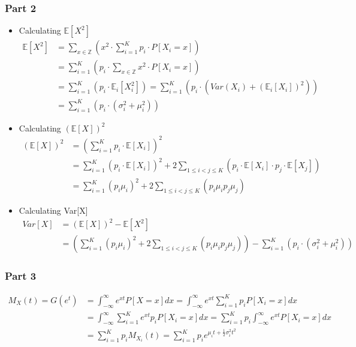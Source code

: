 \subsubsection{Part 2}
\begin{itemize}
\item Calculating $\mathbb{E}[X^2]$
\begin{align*}
    \mathbb{E}[X^2]&=\sum_{x\in \mathbb{Z}} \left(x^2 \cdot \sum_{i=1}^{K} p_i\cdot P[X_i=x] \right) \\
    &=\sum_{i=1}^{K} \left(p_i\cdot \sum_{x\in \mathbb{Z}} x^2 \cdot P[X_i=x]\right)\\
    &=\sum_{i=1}^{K} \left(p_i\cdot \mathbb{E}_i[X_i^2]\right)
    =\sum_{i=1}^{K} \left(p_i\cdot \left(Var(X_i) + \left(\mathbb{E}_i[X_i]\right)^2\right)\right)\\
    &=\sum_{i=1}^{K} \left(p_i\cdot \left(\sigma_i^2 + \mu_i^2\right)\right)
\end{align*}
\item Calculating $\left(\mathbb{E}[X]\right)^2$
\begin{align*}
    \left(\mathbb{E}[X]\right)^2&=\left(\sum_{i=1}^{K} p_i\cdot \mathbb{E}[X_i]\right)^2\\
    &=\sum_{i=1}^{K} \left(p_i\cdot \mathbb{E}[X_i]\right)^2 + 2 \sum_{1\leq i<j\leq K} \left(p_i\cdot \mathbb{E}[X_i] \cdot p_j\cdot \mathbb{E}[X_j]\right)  \\
    &=\sum_{i=1}^{K} \left(p_i \mu_i\right)^2 + 2 \sum_{1\leq i<j\leq K} \left(p_i \mu_i  p_j \mu_j\right)
\end{align*}
\item Calculating Var[X]
\begin{align*}
    Var[X]&=\left(\mathbb{E}[X]\right)^2-\mathbb{E}[X^2]\\
    &=\left(\sum_{i=1}^{K} \left(p_i \mu_i\right)^2 + 2 \sum_{1\leq i<j\leq K} \left(p_i \mu_i  p_j \mu_j\right)\right) - \sum_{i=1}^{K} \left(p_i\cdot \left(\sigma_i^2 + \mu_i^2\right)\right)
\end{align*}
\end{itemize}
\subsubsection{Part 3}
    \begin{align*}
        M_X(t)=G(e^t)&=\int_{-\infty}^{\infty} e^{xt}P[X=x]dx = \int_{-\infty}^{\infty} e^{xt} \sum_{i=1}^{K}p_iP[X_i=x]dx\\
        &= \int_{-\infty}^{\infty}\sum_{i=1}^{K} e^{xt} p_i P[X_i=x]dx = \sum_{i=1}^{K} p_i\int_{-\infty}^{\infty}e^{xt} P[X_i=x]dx\\
        &= \sum_{i=1}^{K} p_i M_{X_i}(t) = \sum_{i=1}^{K} p_i e^{\mu_it+\frac{1}{2}\sigma_i^2t^2} 
    \end{align*}
